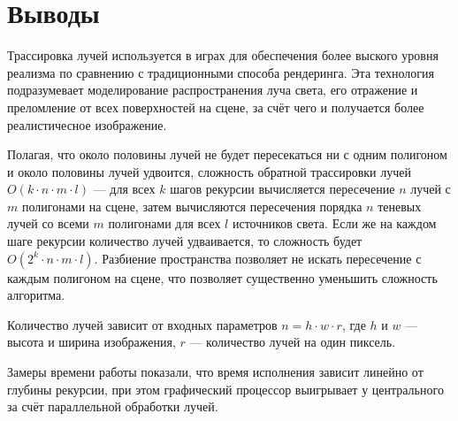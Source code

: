 \section{Выводы}
Трассировка лучей используется в играх для обеспечения более выского уровня реализма по сравнению с традиционными способа рендеринга. Эта технология подразумевает моделирование распространения луча света, его отражение и преломление от всех поверхностей на сцене, за счёт чего и получается более реалистичесное изображение.

Полагая, что около половины лучей не будет пересекаться ни с одним полигоном и около половины лучей удвоится, сложность обратной трассировки лучей $O(k \cdot n \cdot m \cdot l)$ --- для всех $k$ шагов рекурсии вычисляется пересечение $n$ лучей с $m$ полигонами на сцене, затем вычисляются пересечения порядка $n$ теневых лучей со всеми $m$ полигонами для всех $l$ источников света. Если же на каждом шаге рекурсии количество лучей удваивается, то сложность будет $O(2^{k} \cdot n \cdot m \cdot l)$. Разбиение пространства позволяет не искать пересечение с каждым полигоном на сцене, что позволяет существенно уменьшить сложность алгоритма.

Количество лучей зависит от входных параметров $n = h \cdot w \cdot r$, где $h$ и $w$ --- высота и ширина изображения, $r$ --- количество лучей на один пиксель.

Замеры времени работы показали, что время исполнения зависит линейно от глубины рекурсии, при этом графический процессор выигрывает у центрального за счёт параллельной обработки лучей.
\pagebreak

